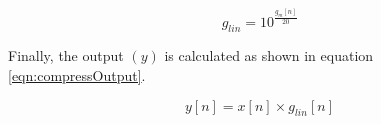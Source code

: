 \documentclass[11pt,onecolumn]{witseiepaper}
\begin{document}
\begin{appendices}
\begin{equation}
\label{eqn:glin}
g_{lin} = 10^{\frac{g_m[n]}{20}}
\end{equation}

\noindent Finally, the output $(y)$ is calculated as shown in equation \ref{eqn:compressOutput}.

\begin{equation}
\label{eqn:compressOutput}
y[n] = x[n] \times g_{lin}[n]
\end{equation}

\FloatBarrier



\end{appendices}
\end{document}
